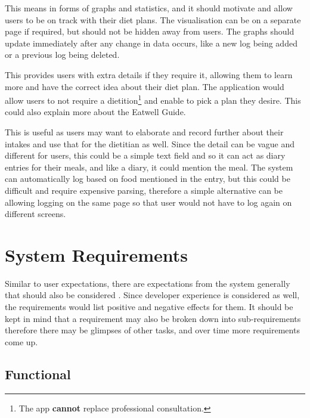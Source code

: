 \documentclass[../main.tex]{subfiles}
\begin{document}

This means in forms of graphs and statistics, and it should motivate and allow users to be on track with their diet plans. The visualisation can be on a separate page if required, but should not be hidden away from users. The graphs should update immediately after any change in data occurs, like a new log being added or a previous log being deleted.


This provides users with extra details if they require it, allowing them to learn more and have the correct idea about their diet plan. The application would allow users to not require a dietition\footnote{The app \textbf{cannot} replace professional consultation.} and enable to pick a plan they desire. This could also explain more about the Eatwell Guide.


This is useful as users may want to elaborate and record further about their intakes and use that for the dietitian as well. Since the detail can be vague and different for users, this could be a simple text field and so it can act as diary entries for their meals, and like a diary, it could mention the meal. The system can automatically log based on food mentioned in the entry, but this could be difficult and require expensive parsing, therefore a simple alternative can be allowing logging on the same page so that user would not have to log again on different screens.

\section{System Requirements}

Similar to user expectations, there are expectations from the system generally that should also be considered \cite{wikiRequirements}. Since developer experience is considered as well, the requirements would list positive and negative effects for them. It should be kept in mind that a requirement may also be broken down into sub-requirements therefore there may be glimpses of other tasks, and over time more requirements come up.

\subsection{Functional}
\end{document}

